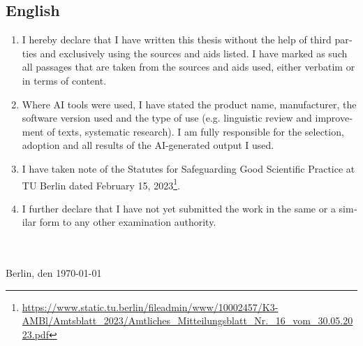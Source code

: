 \begin{otherlanguage}{english}
\section*{English}
\begin{enumerate}[noitemsep]
\item I hereby declare that I have written this thesis without the help of third parties and exclusively using the sources and aids listed. I have marked as such all passages that are taken from the sources and aids used, either verbatim or in terms of content.
\item Where AI tools were used, I have stated the product name, manufacturer, the software version used and the type of use (e.g. linguistic review and improvement of texts, systematic research). I am fully responsible for the selection, adoption and all results of the AI-generated output I used.
\item I have taken note of the Statutes for Safeguarding Good Scientific Practice at TU Berlin dated February 15, 2023\footnote{\url{https://www.static.tu.berlin/fileadmin/www/10002457/K3-AMBl/Amtsblatt_2023/Amtliches_Mitteilungsblatt_Nr._16_vom_30.05.2023.pdf}}.
\item I further declare that I have not yet submitted the work in the same or a similar form to any other examination authority.
\end{enumerate}
\end{otherlanguage}
\begin{otherlanguage}{ngerman}
\vspace*{4ex}
\makebox[3in][l]{\hrulefill}\\
\textsc{\autor} \\
Berlin, den \today
\end{otherlanguage}

